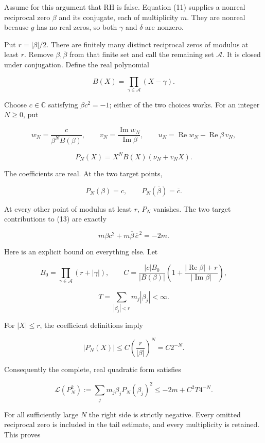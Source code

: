 Assume for this argument that RH is false. Equation (11) supplies a
nonreal reciprocal zero \(\beta\) and its conjugate, each of
multiplicity \(m\). They are nonreal because \(g\) has no real zeros, so
both \(\gamma\) and \(\delta\) are nonzero.

Put \(r=|\beta|/2\). There are finitely many distinct reciprocal zeros
of modulus at least \(r\). Remove \(\beta,\overline\beta\) from that
finite set and call the remaining set \(\mathcal A\). It is closed under
conjugation. Define the real polynomial

\[
B(X)=\prod_{\gamma\in\mathcal A}(X-\gamma).
\tag{15}
\]

Choose \(c\in\mathbb C\) satisfying \(\beta c^2=-1\); either of the two
choices works. For an integer \(N\ge0\), put

\[
w_N=\frac{c}{\beta^NB(\beta)},\qquad
v_N=\frac{\operatorname{Im}w_N}{\operatorname{Im}\beta},\qquad
u_N=\operatorname{Re}w_N-\operatorname{Re}\beta\,v_N,
\]

\[
\boxed{P_N(X)=X^NB(X)(\nu_N+v_NX).}
\tag{16}
\]

The coefficients are real. At the two target points,

\[
P_N(\beta)=c,\qquad P_N(\overline\beta)=\overline c.
\]

At every other point of modulus at least \(r\), \(P_N\) vanishes. The
two target contributions to (13) are exactly

\[
m\beta c^2+m\overline\beta\,\overline c^{\,2}=-2m.
\tag{17}
\]

Here is an explicit bound on everything else. Let

\[
B_0=\prod_{\gamma\in\mathcal A}(r+|\gamma|),\qquad
C=\frac{|c|B_0}{|B(\beta)|}
\left(1+\frac{|\operatorname{Re}\beta|+r}{|\operatorname{Im}\beta|}\right),
\]

\[
T=\sum_{|\beta_j|<r}m_j|\beta_j|<\infty.
\]

For \(|X|\le r\), the coefficient definitions imply

\[
|P_N(X)|\le C\left(\frac r{|\beta|}\right)^N=C2^{-N}.
\]

Consequently the complete, real quadratic form satisfies

\[
\boxed{
\mathcal L(P_N^2)
:=\sum_jm_j\beta_jP_N(\beta_j)^2
\le -2m+C^2T4^{-N}.
}
\tag{18}
\]

For all sufficiently large \(N\) the right side is strictly negative.
Every omitted reciprocal zero is included in the tail estimate, and
every multiplicity is retained. This proves

